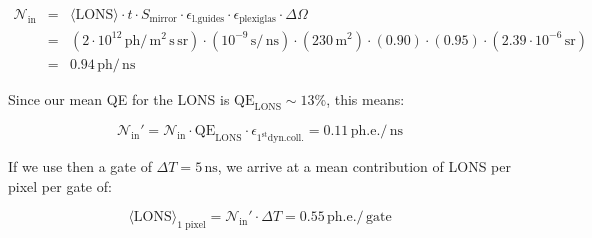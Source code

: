 \documentclass{article}
\renewcommand{\u}[1]{\ensuremath{\mathrm{\,#1}}}  %
\begin{document}
\begin{eqnarray*}
\mathcal{N}_{\mathrm{in}} 
&=& \langle\mathrm{LONS}\rangle 
\cdot t 
\cdot S_{\text{mirror}}
\cdot \epsilon_{\text{l.guides}}
\cdot \epsilon_{\text{plexiglas}}
\cdot \Delta\Omega \\
&=& (2\cdot 10^{12} \u{ph}/\u{m}^2\u{s}\u{sr})
\cdot (10^{-9} \u{s}/\u{ns}) 
\cdot (230 \u{m}^2) 
\cdot (0.90) 
\cdot (0.95) 
\cdot (2.39\cdot 10^{-6} \u{sr})  \\
&=& 0.94 \u{ph}/\u{ns} 
\end{eqnarray*}

Since our mean QE for the LONS is $\mathrm{QE}_{\mathrm{LONS}} \sim
13\%$, this means:

\[
\mathcal{N}_{\mathrm{in}}' = \mathcal{N}_{\mathrm{in}} 
\cdot \mathrm{QE}_{\mathrm{LONS}} 
\cdot \epsilon_{1^{\mathrm{st}}\text{dyn.coll.}}
= 0.11 \u{ph.e.}/\u{ns}
\]

If we use then a gate of $\Delta T=5\u{ns}$, we arrive at a mean
contribution of LONS per pixel per gate of:

\[
\langle\text{LONS}\rangle_{\text{1 pixel}} =
\mathcal{N}_{\mathrm{in}}' \cdot \Delta T = 0.55 \u{ph.e.}/\u{gate}
\]
\end{document}
